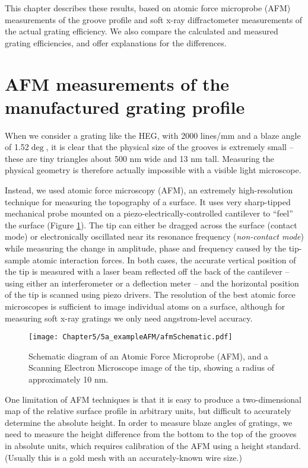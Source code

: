 This chapter describes these results, based on atomic force microprobe (AFM) measurements of the groove profile and soft x-ray diffractometer measurements of the actual grating efficiency.  We also compare the calculated and measured grating efficiencies, and offer explanations for the differences.

\section{AFM measurements of the manufactured grating profile}
When we consider a grating like the HEG, with 2000 lines/mm and a blaze angle of 1.52$\deg$, it is clear that the physical size of the grooves is extremely small -- these are tiny triangles about 500 nm wide and 13 nm tall.  Measuring the physical geometry is therefore actually impossible with a visible light microscope.

Instead, we used atomic force microscopy (AFM), an extremely high-resolution technique for measuring the topography of a surface.  It uses very sharp-tipped mechanical probe mounted on a piezo-electrically-controlled cantilever to ``feel'' the surface (Figure \ref{afm}).  The tip can either be dragged across the surface (contact mode) or electronically oscillated near its resonance frequency (\emph{non-contact mode}) while measuring the change in amplitude, phase and frequency caused by the tip-sample atomic interaction forces.  In both cases, the accurate vertical position of the tip is measured with a laser beam reflected off the back of the cantilever -- using either an interferometer or a deflection meter -- and the horizontal position of the tip is scanned using piezo drivers.  The resolution of the best atomic force microscopes is sufficient to image individual atoms on a surface, although for measuring soft x-ray gratings we only need angstrom-level accuracy.

\begin{figure}[htbp] %
   \centering
   \texttt{[image: Chapter5/5a\_exampleAFM/afmSchematic.pdf]} 
   \caption{Schematic diagram of an Atomic Force Microprobe (AFM), and a Scanning Electron Microscope image of the tip, showing a radius of approximately 10 nm.}
   \label{afm}
\end{figure}

One limitation of AFM techniques is that it is easy to produce a two-dimensional map of the relative surface profile in arbitrary units, but difficult to accurately determine the absolute height.  In order to measure blaze angles of gratings, we need to measure the height difference from the bottom to the top of the grooves in absolute units, which requires calibration of the AFM using a height standard.  (Usually this is a gold mesh with an accurately-known wire size.)

